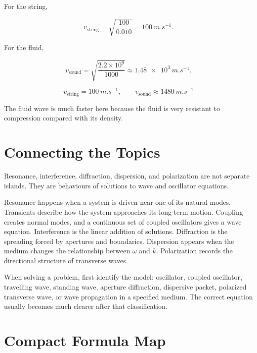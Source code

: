 \documentclass{studentnotes}
\begin{document}
For the string,

\[
    v_{\text{string}}=\sqrt{\frac{100}{0.010}}=\SI{100}{m.s^{-1}}.
\]

For the fluid,

\[
    v_{\text{sound}}=\sqrt{\frac{2.2\times10^9}{1000}}
    \approx\SI{1.48e3}{m.s^{-1}}.
\]

\[
    \boxed{v_{\text{string}}=\SI{100}{m.s^{-1}},
    \qquad
    v_{\text{sound}}\approx\SI{1480}{m.s^{-1}}}
\]

The fluid wave is much faster here because the fluid is very resistant to
compression compared with its density.

\section{Connecting the Topics}

Resonance, interference, diffraction, dispersion, and polarization are not
separate islands. They are behaviours of solutions to wave and oscillator
equations.

Resonance happens when a system is driven near one of its natural modes.
Transients describe how the system approaches its long-term motion. Coupling
creates normal modes, and a continuous set of coupled oscillators gives a wave
equation. Interference is the linear addition of solutions. Diffraction is the
spreading forced by apertures and boundaries. Dispersion appears when the medium
changes the relationship between \(\omega\) and \(k\). Polarization records the
directional structure of transverse waves.

\begin{importantnote}
    When solving a problem, first identify the model: oscillator, coupled
    oscillator, travelling wave, standing wave, aperture diffraction, dispersive
    packet, polarized transverse wave, or wave propagation in a specified medium.
    The correct equation usually becomes much clearer after that classification.
\end{importantnote}

\section{Compact Formula Map}
\end{document}
